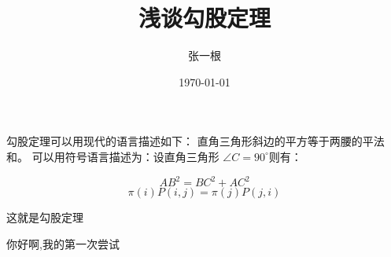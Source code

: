 \documentclass{article}
\title{\heiti 浅谈勾股定理}
\author{\kaishu 张一根}
\date{\today}
\newcommand\degree{^\circ}
\begin{document}
    勾股定理可以用现代的语言描述如下：
    直角三角形斜边的平方等于两腰的平法和。
    可以用符号语言描述为：设直角三角形 
    $\angle C=90\degree $则有：

    $$ 
        AB^2 = BC^2 + AC^2 
    $$
$$\pi(i)P(i,j)=\pi(j)P(j,i) $$

    这就是勾股定理

    你好啊,我的第一次尝试
    
\end{document}
